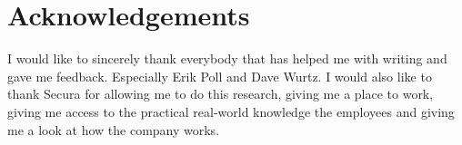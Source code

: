 \chapter{Acknowledgements}
I would like to sincerely thank everybody that has helped me with writing and gave me feedback. Especially Erik Poll and Dave Wurtz. I would also like to thank Secura for allowing me to do this research, giving me a place to work, giving me access to the practical real-world knowledge the employees and giving me a look at how the company works.
